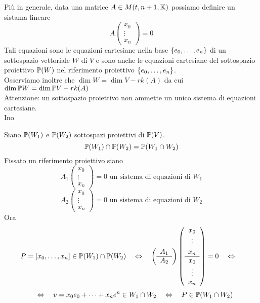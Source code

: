 \begin{oss}Pi\`u in generale, data una matrice $A\in M(t,n+1,\mathbb{K})$ possiamo definire un sistama lineare
\begin{equation}
\label{sis_lin}
A \begin{pmatrix}
x_0 \\ \vdots \\ x_n
\end{pmatrix} =0
\end{equation}
Tali equazioni sono le equazioni cartesiane nella base $\left\{ e_0, \dots, e_n \right\}$ di un sottospazio vettoriale $W$ di $V$ e sono anche le equazioni cartesiane del sottospazio proiettivo $\mathbb{P}(W)$ nel riferimento proiettivo $\left\{ e_0, \dots, e_n \right\}$.\\
Osserviamo inoltre che $\dim W = \dim V -rk(A) $ da cui $\dim \mathbb{P} W =\dim \mathbb{P} V -rk(A)$\\
Attenzione: un sottospazio proiettivo non ammette un unico sistema di equazioni cartesiane.\\
Ino
\end{oss}
\spazio
\begin{lem}Siano $\mathbb{P}(W_1)$ e $\mathbb{P}(W_2)$ sottospazi proiettivi di $\mathbb{P}(V)$.
$$ \mathbb{P}(W_1) \cap \mathbb{P}(W_2)=\mathbb{P}(W_1\cap W_2)$$
\proof Fissato un riferimento proiettivo siano 
$$ A_1 \begin{pmatrix}
x_0 \\ \vdots \\ x_n 
\end{pmatrix}=0 \text{ un sistema di equazioni di }W_1$$
$$ A_2 \begin{pmatrix}
x_0 \\ \vdots \\ x_n 
\end{pmatrix}=0 \text{ un sistema di equazioni di }W_2$$
Ora 
$$ P=[x_0, \dots, x_n] \in \mathbb{P}(W_1)\cap \mathbb{P}(W_2) \quad \Leftrightarrow \quad   
\left( \begin{array}{c}
A_1 \\
\hline A_2 
\end{array} \right)  \left( \begin{array}{c} x_0 \\ \vdots \\ x_n \\ \hline  x_0 \\ \vdots \\ x_n
\end{array} \right) =0 \quad \Leftrightarrow \quad  $$
$$ \quad \Leftrightarrow \quad v=x_0e_0 +\dots + x_n e^n \in W_1\cap W_2 \quad \Leftrightarrow \quad P\in \mathbb{P}(W_1\cap W_2)$$
\end{lem}
